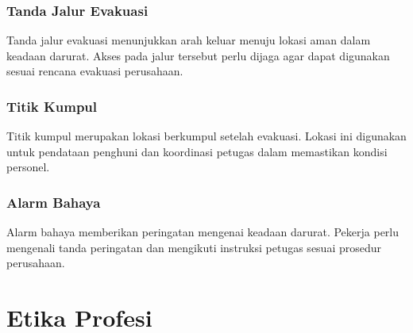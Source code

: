 \Needspace{6.8cm}
\subsubsection{Tanda Jalur Evakuasi}

Tanda jalur evakuasi menunjukkan arah keluar menuju lokasi aman dalam keadaan darurat. Akses pada jalur tersebut perlu dijaga agar dapat digunakan sesuai rencana evakuasi perusahaan.


\Needspace{6.8cm}
\subsubsection{Titik Kumpul}

Titik kumpul merupakan lokasi berkumpul setelah evakuasi. Lokasi ini digunakan untuk pendataan penghuni dan koordinasi petugas dalam memastikan kondisi personel.


\Needspace{6.8cm}
\subsubsection{Alarm Bahaya}

Alarm bahaya memberikan peringatan mengenai keadaan darurat. Pekerja perlu mengenali tanda peringatan dan mengikuti instruksi petugas sesuai prosedur perusahaan.


\setlength{\TinggiRuangGambar}{3.2cm}
\setlength{\BatasTinggiGambar}{0.58\textheight}
\begingroup
\titlespacing*{\section}{0pt}{8pt}{2pt}
\titlespacing*{\subsection}{0pt}{4pt}{2pt}
\Needspace{5cm}
\section{Etika Profesi}

